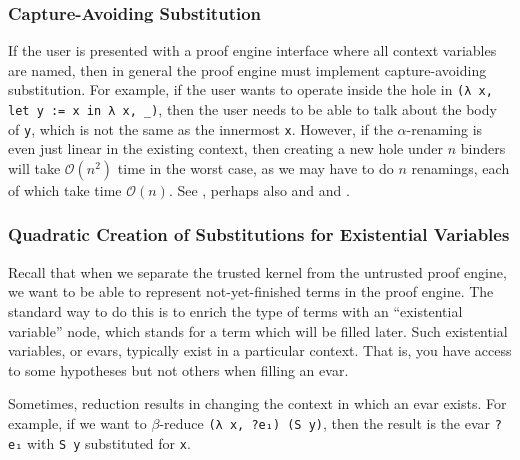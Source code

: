 
\subsubsection{Capture-Avoiding Substitution} \label{sec:perf:capture-avoiding-subst}
If the user is presented with a proof engine interface where all context variables are named, then in general the proof engine must implement capture-avoiding substitution.
For example, if the user wants to operate inside the hole in \texttt{(λ x, let y := x in λ x, _)}, then the user needs to be able to talk about the body of \texttt{y}, which is not the same as the innermost \texttt{x}.
However, if the $\alpha$-renaming is even just linear in the existing context, then creating a new hole under $n$ binders will take $\mathcal{O}(n^2)$ time in the worst case, as we may have to do $n$ renamings, each of which take time $\mathcal O(n)$.
See , perhaps also  and  and .


\subsubsection{Quadratic Creation of Substitutions for Existential Variables} \label{sec:perf:quadratic-evar-subst}
Recall  that when we separate the trusted kernel from the untrusted proof engine, we want to be able to represent not-yet-finished terms in the proof engine.
The standard way to do this is to enrich the type of terms with an ``existential variable'' node, which stands for a term which will be filled later.
Such existential variables, or evars, typically exist in a particular context.
That is, you have access to some hypotheses but not others when filling an evar.

Sometimes, reduction results in changing the context in which an evar exists.
For example, if we want to $\beta$-reduce \texttt{(λ x, ?e₁) (S y)}, then the result is the evar \texttt{?e₁} with \texttt{S y} substituted for \texttt{x}.

